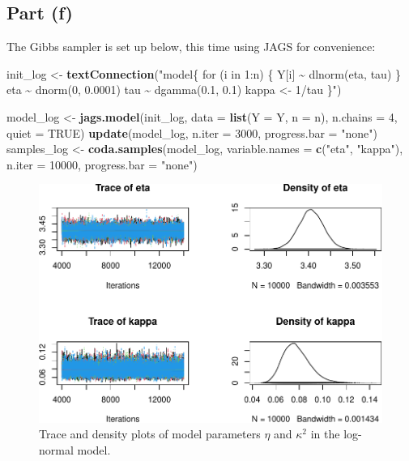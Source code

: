 \documentclass[
]{homework}
\newenvironment{Shaded}{\begin{snugshade}}{\end{snugshade}}
\newcommand{\AttributeTok}[1]{\textcolor[rgb]{0.13,0.29,0.53}{#1}}
\newcommand{\ConstantTok}[1]{\textcolor[rgb]{0.56,0.35,0.01}{#1}}
\newcommand{\DecValTok}[1]{\textcolor[rgb]{0.00,0.00,0.81}{#1}}
\newcommand{\FunctionTok}[1]{\textcolor[rgb]{0.13,0.29,0.53}{\textbf{#1}}}
\newcommand{\NormalTok}[1]{#1}
\newcommand{\OtherTok}[1]{\textcolor[rgb]{0.56,0.35,0.01}{#1}}
\newcommand{\StringTok}[1]{\textcolor[rgb]{0.31,0.60,0.02}{#1}}
\begin{document}
\subsection{Part (f)}\label{part-f}

The Gibbs sampler is set up below, this time using \textsf{JAGS} for convenience:

\begin{Shaded}
\begin{Highlighting}[]
\NormalTok{init\_log }\OtherTok{\textless{}{-}} \FunctionTok{textConnection}\NormalTok{(}\StringTok{"model\{}
\StringTok{  for (i in 1:n) \{}
\StringTok{    Y[i] \textasciitilde{} dlnorm(eta, tau)}
\StringTok{  \}}
\StringTok{  }
\StringTok{  eta \textasciitilde{} dnorm(0, 0.0001)}
\StringTok{  tau \textasciitilde{} dgamma(0.1, 0.1)}
\StringTok{  kappa \textless{}{-} 1/tau}
\StringTok{\}"}\NormalTok{)}

\NormalTok{model\_log }\OtherTok{\textless{}{-}} \FunctionTok{jags.model}\NormalTok{(init\_log, }\AttributeTok{data =} \FunctionTok{list}\NormalTok{(}\AttributeTok{Y =}\NormalTok{ Y, }\AttributeTok{n =}\NormalTok{ n), }\AttributeTok{n.chains =} \DecValTok{4}\NormalTok{, }\AttributeTok{quiet =} \ConstantTok{TRUE}\NormalTok{)}
\FunctionTok{update}\NormalTok{(model\_log, }\AttributeTok{n.iter =} \DecValTok{3000}\NormalTok{, }\AttributeTok{progress.bar =} \StringTok{"none"}\NormalTok{)}
\NormalTok{samples\_log }\OtherTok{\textless{}{-}} \FunctionTok{coda.samples}\NormalTok{(model\_log, }\AttributeTok{variable.names =} \FunctionTok{c}\NormalTok{(}\StringTok{"eta"}\NormalTok{, }\StringTok{"kappa"}\NormalTok{), }\AttributeTok{n.iter =} \DecValTok{10000}\NormalTok{, }
                            \AttributeTok{progress.bar =} \StringTok{"none"}\NormalTok{)}
\end{Highlighting}
\end{Shaded}

\begin{figure}

{\centering \includegraphics[width=0.75\linewidth]{finalexam_files/figure-latex/ex2-log-trace-1} 

}

\caption{Trace and density plots of model parameters $\eta$ and $\kappa^2$ in the log-normal model.}\label{fig:ex2-log-trace}
\end{figure}
\end{document}

